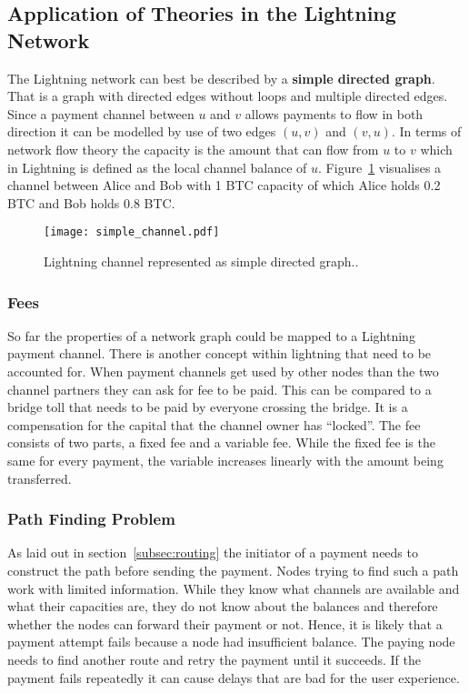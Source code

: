 \documentclass[final]{fhnwreport}       %
\begin{document}
\subsection{Application of Theories in the Lightning Network}
The Lightning network can best be described by a \textbf{simple directed graph}. That is a graph with directed edges without loops and multiple directed edges. Since a payment channel between $u$ and $v$ allows payments to flow in both direction it can be modelled by use of two edges $(u, v)$ and $(v, u)$. In terms of network flow theory the capacity is the amount that can flow from $u$ to $v$ which in Lightning is defined as the local channel balance of $u$. Figure~\ref{fig:channel_graph} visualises a channel between Alice and Bob with 1 BTC capacity of which Alice holds 0.2 BTC and Bob holds 0.8 BTC.

\begin{figure}[H]
\centering
\texttt{[image: simple\_channel.pdf]}
\caption{Lightning channel represented as simple directed graph..}
\label{fig:channel_graph}
\end{figure}

\subsubsection{Fees}
So far the properties of a network graph could be mapped to a Lightning payment channel. There is another concept within lightning that need to be accounted for. When payment channels get used by other nodes than the two channel partners they can ask for fee to be paid. This can be compared to a bridge toll that needs to be paid by everyone crossing the bridge. It is a compensation for the capital that the channel owner has ``locked''. The fee consists of two parts, a fixed fee and a variable fee. While the fixed fee is the same for every payment, the variable increases linearly with the amount being transferred.

\subsubsection{Path Finding Problem}
As laid out in section~\ref{subsec:routing} the initiator of a payment needs to construct the path before sending the payment. Nodes trying to find such a path work with limited information. While they know what channels are available and what their capacities are, they do not know about the balances and therefore whether the nodes can forward their payment or not. Hence, it is likely that a payment attempt fails because a node had insufficient balance. The paying node needs to find another route and retry the payment until it succeeds. If the payment fails repeatedly it can cause delays that are bad for the user experience.
\end{document}
